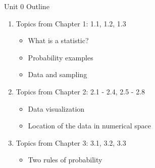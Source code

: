 \documentclass{beamer}
\begin{document}
\begin{frame}{Unit 0 Outline}
\begin{enumerate}
\item Topics from Chapter 1: 1.1, 1.2, 1.3
\begin{itemize}
\item What is a statistic?
\item Probability examples
\item Data and sampling
\end{itemize}
\item Topics from Chapter 2: 2.1 - 2.4, 2.5 - 2.8
\begin{itemize}
\item Data visualization
\item Location of the data in numerical space
\end{itemize}
\item Topics from Chapter 3: 3.1, 3.2, 3.3
\begin{itemize}
\item Two rules of probability
\end{itemize}
\end{enumerate}
\end{frame}
\end{document}

